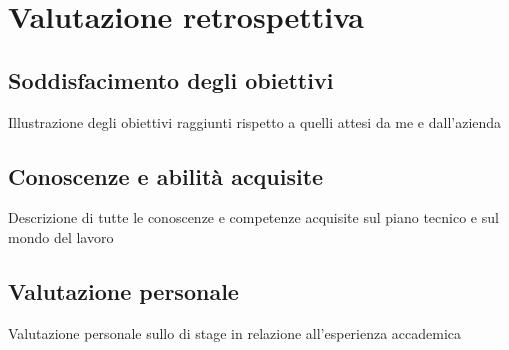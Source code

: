 
\chapter{Valutazione retrospettiva}
\label{cap:retrospettiva}

\section{Soddisfacimento degli obiettivi}
Illustrazione degli obiettivi raggiunti rispetto a quelli attesi da me e dall'azienda
\section{Conoscenze e abilità acquisite}
Descrizione di tutte le conoscenze e competenze acquisite sul piano tecnico e sul mondo del lavoro
\section{Valutazione personale}
Valutazione personale sullo di stage in relazione all'esperienza accademica

